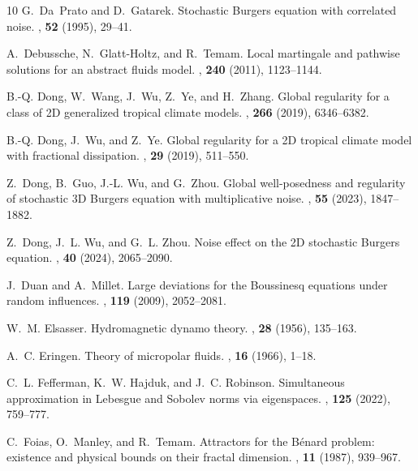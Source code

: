 \documentclass[11pt, reqno]{amsart}
\theoremstyle{definition}
\numberwithin{equation}{section}
\begin{document}
\begin{thebibliography}{10}
	G.~Da~Prato and D.~Gatarek.
	\newblock Stochastic {B}urgers equation with correlated noise.
	,  {\bf 52} (1995), 29--41.
	
	A.~Debussche, N.~Glatt-Holtz, and R.~Temam.
	\newblock Local martingale and pathwise solutions for an abstract fluids model.
	,  {\bf 240} (2011), 1123--1144.
	
	B.-Q. Dong, W.~Wang, J.~Wu, Z.~Ye, and H.~Zhang.
	\newblock Global regularity for a class of 2{D} generalized tropical climate
	models.
	,  {\bf 266} (2019), 6346--6382.
	
	B.-Q. Dong, J.~Wu, and Z.~Ye.
	\newblock Global regularity for a 2{D} tropical climate model with fractional
	dissipation.
	,  {\bf 29} (2019), 511--550.
	
	Z.~Dong, B.~Guo, J.-L. Wu, and G.~Zhou.
	\newblock Global well-posedness and regularity of stochastic 3{D} {B}urgers
	equation with multiplicative noise.
	,  {\bf 55} (2023), 1847--1882.
	
	Z.~Dong, J.~L. Wu, and G.~L. Zhou.
	\newblock Noise effect on the 2{D} stochastic {B}urgers equation.
	,  {\bf 40} (2024), 2065--2090.
	
	J.~Duan and A.~Millet.
	\newblock Large deviations for the {B}oussinesq equations under random
	influences.
	,  {\bf 119} (2009), 2052--2081.
	
	W.~M. Elsasser.
	\newblock Hydromagnetic dynamo theory.
	,  {\bf 28} (1956), 135--163.
	
	A.~C. Eringen.
	\newblock Theory of micropolar fluids.
	,  {\bf 16} (1966), 1--18.
	
	C.~L. Fefferman, K.~W. Hajduk, and J.~C. Robinson.
	\newblock Simultaneous approximation in {L}ebesgue and {S}obolev norms via
	eigenspaces.
	,  {\bf 125} (2022), 759--777.
	
	C.~Foias, O.~Manley, and R.~Temam.
	\newblock Attractors for the {B}\'enard problem: existence and physical bounds
	on their fractal dimension.
	,  {\bf 11} (1987), 939--967.
	

\end{thebibliography}
\end{document}
